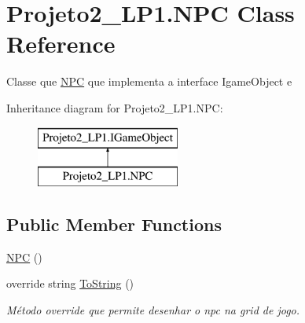 \hypertarget{class_projeto2___l_p1_1_1_n_p_c}{}\section{Projeto2\+\_\+\+L\+P1.\+N\+PC Class Reference}
\label{class_projeto2___l_p1_1_1_n_p_c}


Classe que \mbox{\hyperlink{class_projeto2___l_p1_1_1_n_p_c}{N\+PC}} que implementa a interface Igame\+Object e  


Inheritance diagram for Projeto2\+\_\+\+L\+P1.\+N\+PC\+:\begin{figure}[H]
\begin{center}
\leavevmode
\includegraphics[height=2.000000cm]{class_projeto2___l_p1_1_1_n_p_c}
\end{center}
\end{figure}
\subsection*{Public Member Functions}
\begin{DoxyCompactItemize}
\item 
\mbox{\hyperlink{class_projeto2___l_p1_1_1_n_p_c_a043637b5314dd4174b26a30f2af54584}{N\+PC}} ()
\item 
override string \mbox{\hyperlink{class_projeto2___l_p1_1_1_n_p_c_ad23ebbb5686f2de8eecb7b53cc22ee31}{To\+String}} ()
\begin{DoxyCompactList}\small\item\em Método override que permite desenhar o npc na grid de jogo. \end{DoxyCompactList}\end{DoxyCompactItemize}
